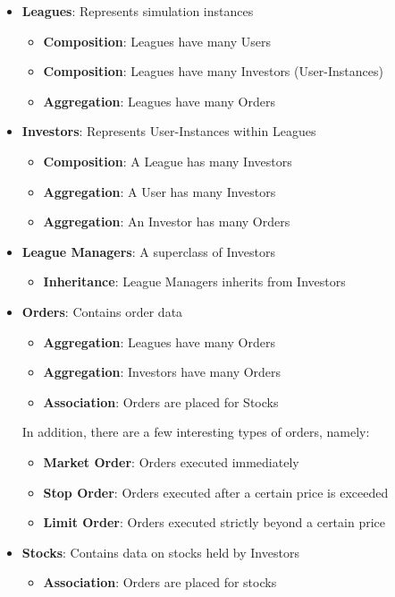 \begin{itemize}
\begin{itemize}
\begin{itemize}
		\end{itemize}
	\item \textbf{Leagues}: Represents simulation instances
		\begin{itemize}
		\item \textbf{Composition}: Leagues have many Users
		\item \textbf{Composition}: Leagues have many Investors (User-Instances)
		\item \textbf{Aggregation}: Leagues have many Orders
		\end{itemize}
	\item \textbf{Investors}: Represents User-Instances within Leagues
		\begin{itemize}
		\item \textbf{Composition}: A League has many Investors
		\item \textbf{Aggregation}: A User has many Investors
		\item \textbf{Aggregation}: An Investor has many Orders
		\end{itemize}
	\item \textbf{League Managers}: A superclass of Investors
		\begin{itemize}
		\item \textbf{Inheritance}: League Managers inherits from Investors
		\end{itemize}	
	\item \textbf{Orders}: Contains order data
		\begin{itemize}
		\item \textbf{Aggregation}: Leagues have many Orders
		\item \textbf{Aggregation}: Investors have many Orders
		\item \textbf{Association}: Orders are placed for Stocks
		\end{itemize}
	
		In addition, there are a few interesting types of orders, namely:
		\begin{itemize}
		\item \textbf{Market Order}: Orders executed immediately
		\item \textbf{Stop Order}: Orders executed after a certain price is exceeded
		\item \textbf{Limit Order}: Orders executed strictly beyond a certain price
		\end{itemize}
	\item \textbf{Stocks}: Contains data on stocks held by Investors
		\begin{itemize}
		\item \textbf{Association}: Orders are placed for stocks
		\end{itemize}
	\end{itemize}
\end{itemize}



